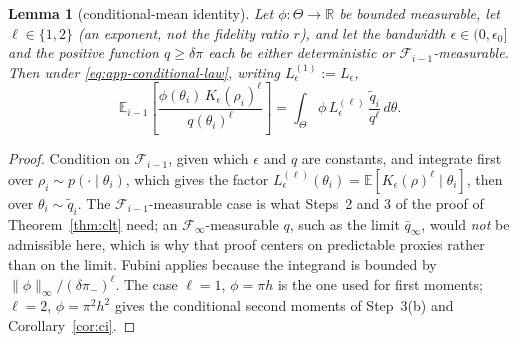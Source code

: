 \documentclass[10pt]{article}
\theoremstyle{plain}
\newtheorem{lemma}[theorem]{Lemma}
\theoremstyle{definition}
\begin{document}
\begin{lemma}[conditional-mean identity]\label{lem:condmean}
Let $\phi:\Theta\to\mathbb{R}$ be bounded measurable, let $\ell\in\{1,2\}$ (an exponent, not the fidelity ratio $r$), and let the bandwidth $\epsilon\in(0,\epsilon_0]$ and the positive function $q\ge\delta\pi$ each be either deterministic or $\mathcal{F}_{i-1}$-measurable. Then under \eqref{eq:app-conditional-law}, writing $L^{(1)}_\epsilon:=L_\epsilon$,
\[
\mathbb{E}_{i-1}\!\left[\frac{\phi(\theta_i)\,K_\epsilon(\rho_i)^{\ell}}{q(\theta_i)^{\ell}}\right]
=\int_\Theta \phi\,L^{(\ell)}_\epsilon\,\frac{\tilde q_i}{q^{\ell}}\,d\theta .
\]
\end{lemma}
\begin{proof}
Condition on $\mathcal{F}_{i-1}$, given which $\epsilon$ and $q$ are constants, and integrate first over $\rho_i\sim p(\cdot\mid\theta_i)$, which gives the factor $L^{(\ell)}_\epsilon(\theta_i)=\mathbb{E}[K_\epsilon(\rho)^\ell\mid\theta_i]$, then over $\theta_i\sim\tilde q_i$. The $\mathcal{F}_{i-1}$-measurable case is what Steps~2 and 3 of the proof of Theorem~\ref{thm:clt} need; an $\mathcal{F}_\infty$-measurable $q$, such as the limit $\bar q_\infty$, would \emph{not} be admissible here, which is why that proof centers on predictable proxies rather than on the limit. Fubini applies because the integrand is bounded by $\|\phi\|_\infty/(\delta\pi_-)^{\ell}$. The case $\ell=1$, $\phi=\pi h$ is the one used for first moments; $\ell=2$, $\phi=\pi^2h^2$ gives the conditional second moments of Step~3(b) and Corollary~\ref{cor:ci}.
\end{proof}
\end{document}
